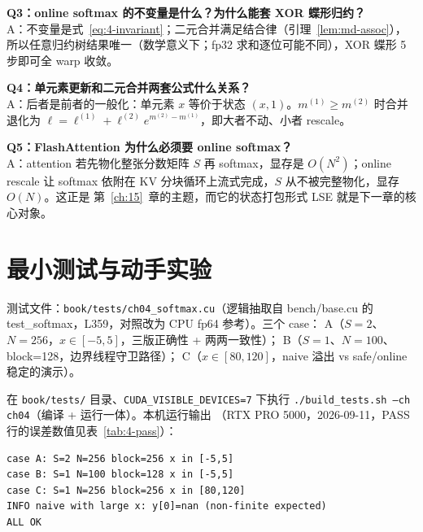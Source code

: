 \textbf{Q3：online softmax 的不变量是什么？为什么能套 XOR 蝶形归约？}\\
A：不变量是式~\ref{eq:4-invariant}；二元合并满足结合律（引理~\ref{lem:md-assoc}），
所以任意归约树结果唯一（数学意义下；fp32 求和逐位可能不同），XOR 蝶形 5 步即可全 warp 收敛。

\textbf{Q4：单元素更新和二元合并两套公式什么关系？}\\
A：后者是前者的一般化：单元素 $x$ 等价于状态 $(x, 1)$。$m^{(1)} \ge m^{(2)}$ 时合并退化为
$\ell = \ell^{(1)} + \ell^{(2)} e^{m^{(2)} - m^{(1)}}$，即大者不动、小者 rescale。

\textbf{Q5：FlashAttention 为什么必须要 online softmax？}\\
A：attention 若先物化整张分数矩阵 $S$ 再 softmax，显存是 $O(N^{2})$；online rescale 让
softmax 依附在 KV 分块循环上流式完成，$S$ 从不被完整物化，显存 $O(N)$。这正是
第~\ref{ch:15}~章的主题，而它的状态打包形式 LSE 就是下一章的核心对象。

\section{最小测试与动手实验}

测试文件：\texttt{book/\allowbreak{}tests/\allowbreak{}ch04\_\allowbreak{}softmax.\allowbreak{}cu}（逻辑抽取自 bench/base.cu 的
test\_softmax，L359，对照改为 CPU fp64 参考）。三个 case：
A（$S=2$、$N=256$，$x \in [-5,5]$，三版正确性 + 两两一致性）；
B（$S=1$、$N=100$、block=128，边界线程守卫路径）；
C（$x \in [80,120]$，naive 溢出 vs safe/online 稳定的演示）。

在 \texttt{book/tests/} 目录、\texttt{CUDA\_\allowbreak{}VISIBLE\_\allowbreak{}DEVICES=\allowbreak{}7} 下执行
\texttt{.\allowbreak{}/\allowbreak{}build\_\allowbreak{}tests.\allowbreak{}sh --ch ch04}（编译 + 运行一体）。本机运行输出
（RTX PRO 5000，2026-09-11，PASS 行的误差数值见表~\ref{tab:4-pass}）：

\begin{lstlisting}[style=console]
case A: S=2 N=256 block=256 x in [-5,5]
case B: S=1 N=100 block=128 x in [-5,5]
case C: S=1 N=256 block=256 x in [80,120]
INFO naive with large x: y[0]=nan (non-finite expected)
ALL OK
\end{lstlisting}

